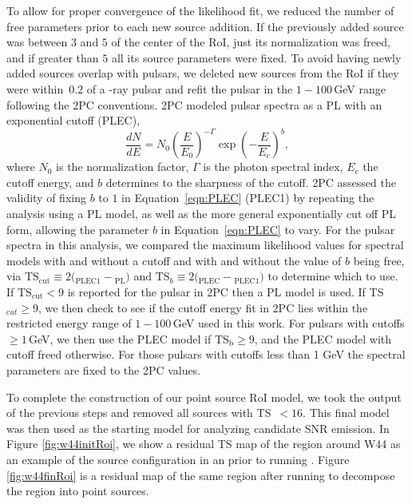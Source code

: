 To allow for proper convergence of the likelihood fit, we reduced the number of free parameters prior to each new source addition. If the previously added source was between $3$\degr{} and $5$\degr{} of the center of the RoI, just its normalization was freed, and if greater than $5$\degr{} all its source parameters were fixed.
To avoid having newly added sources overlap with pulsars, we deleted new sources from the RoI if they were within~$0.2$\degr{} of a \g-ray pulsar and refit the pulsar in the $1-100$\,GeV range following the 2PC conventions. 
2PC modeled pulsar spectra as a PL with an exponential cutoff (PLEC),
\begin{equation}
\newcommand{\pfrac}[2]{\left(\frac{#1}{#2}\right)} \frac{dN}{dE} = N_0 \pfrac{E}{E_0}^{-\Gamma} \exp\left(-\frac{E}{E_c}\right)^{b},
\label{eqn:PLEC}
\end{equation}
where \textit{$N_0$} is the normalization factor, \textit{$\Gamma$} is the photon spectral index, \textit{$E_c$} the cutoff energy, and $b$ determines to the sharpness of the cutoff. 2PC assessed the validity of fixing $b$ to $1$ in Equation~\ref{eqn:PLEC} (PLEC1) by repeating the analysis using a PL model, as well as the more general exponentially cut off PL form, allowing the parameter $b$ in Equation~\ref{eqn:PLEC} to vary. For the pulsar spectra in this analysis, we compared the maximum likelihood values for spectral models with and without a cutoff and with and without the value of $b$ being free, via $\mathrm{TS_{cut}} \equiv 2 ($\logL{}$_{\mathrm{PLEC1}}-$\logL{}$_{\mathrm{PL}})$ and $\mathrm{TS}_{b} \equiv 2 ($\logL{}$_{\mathrm{PLEC}}-$\logL{}$_{\mathrm{PLEC1}})$ to determine which to use. If $\mathrm{TS_{cut}} < 9$ is reported for the pulsar in 2PC then a PL model is used. If TS$_{\mathrm cut} \geq 9$, we then check to see if the cutoff energy fit in 2PC lies within the restricted energy range of $1-100$\,GeV used in this work. For pulsars with cutoffs $\geq 1$\,GeV, we then use the PLEC model if TS$_{\mathrm b} \geq 9$, and the PLEC model with cutoff freed otherwise. For those pulsars with cutoffs less than 1 GeV the spectral parameters are fixed to the 2PC values.

To complete the construction of our point source RoI model, we took the output of the previous steps and removed all sources with TS~$< 16$. This final model was then used as the starting model for analyzing candidate SNR emission. In Figure \ref{fig:w44initRoi}, we show a residual TS map of the region around \snr{} W44 as an example of the source configuration in an \roi{} prior to running \srcs{}. Figure \ref{fig:w44finRoi} is a residual \ts{} map of the same region after running \srcs{} to decompose the region into point sources.

